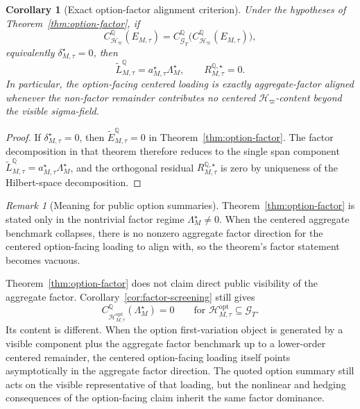 \documentclass[11pt,a4paper]{amsart}
\theoremstyle{plain}
\newtheorem{corollary}[theorem]{Corollary}
\theoremstyle{definition}
\theoremstyle{remark}
\newtheorem{remark}[theorem]{Remark}
\newcommand{\QQ}{\mathbb{Q}}
\newcommand{\cG}{\mathcal{G}}
\newcommand{\cH}{\mathcal{H}}
\begin{document}
\begin{corollary}[Exact option-factor alignment criterion]\label{cor:option-factor-exact}
Under the hypotheses of Theorem~\ref{thm:option-factor}, if
\[
        C_{\cH_\varpi}^\QQ(E_{M,\tau})
        =
        C_{\cG_T}^\QQ\bigl(C_{\cH_\varpi}^\QQ(E_{M,\tau})\bigr),
\]
equivalently \(\delta_{M,\tau}^\star=0\), then
\[
        \widetilde L_{M,\tau}^\QQ
        =
        a_{M,\tau}^\star\Lambda_M^\star,
        \qquad
        R_{M,\tau}^{\QQ,\star}=0.
\]
In particular, the option-facing centered loading is exactly aggregate-factor aligned whenever the
non-factor remainder contributes no centered \(\cH_\varpi\)-content beyond the visible sigma-field.
\end{corollary}

\begin{proof}
If \(\delta_{M,\tau}^\star=0\), then \(\widetilde E_{M,\tau}^\QQ=0\) in
Theorem~\ref{thm:option-factor}.  The factor decomposition in that theorem therefore reduces to
the single span component
\(\widetilde L_{M,\tau}^\QQ=a_{M,\tau}^\star\Lambda_M^\star\), and the orthogonal residual
\(R_{M,\tau}^{\QQ,\star}\) is zero by uniqueness of the Hilbert-space decomposition.
\end{proof}

\begin{remark}[Meaning for public option summaries]
Theorem~\ref{thm:option-factor} is stated only in the nontrivial factor regime
\(\Lambda_M^\star\neq0\).  When the centered aggregate benchmark collapses, there is no nonzero
aggregate factor direction for the centered option-facing loading to align with, so the theorem's
factor statement becomes vacuous.

Theorem~\ref{thm:option-factor} does not claim direct public visibility of the aggregate factor.
Corollary~\ref{cor:factor-screening} still gives
\[
        C_{\cH_{M,\tau}^{\mathrm{opt}}}^\QQ(\Lambda_M^\star)=0
        \qquad
        \text{for }
        \cH_{M,\tau}^{\mathrm{opt}}\subseteq\cG_T.
\]
Its content is different.  When the option first-variation object is generated by a
visible component plus the aggregate factor benchmark up to a lower-order centered
remainder, the centered option-facing loading itself points asymptotically in the aggregate factor
direction.  The quoted option summary still acts on the visible representative of that loading, but
the nonlinear and hedging consequences of the option-facing claim inherit the same factor
dominance.
\end{remark}
\end{document}
